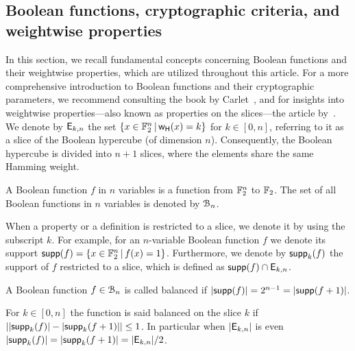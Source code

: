 \documentclass[11pt]{llncs}
\begin{document}
\subsection{Boolean functions, cryptographic criteria, and weightwise properties}

In this section, we recall fundamental concepts concerning Boolean functions and their weightwise properties, which are utilized throughout this article. For a more comprehensive introduction to Boolean functions and their cryptographic parameters, we recommend consulting the book by Carlet~\cite{Carlet20},
and for insights into weightwise properties—also known as properties on the slices—the article by~\cite{TOSC:CarMeaRot17}.
We denote by $\mathsf{E}_{k,n}$ the set $\{x\in \mathbb{F}_2^n \, | \, \mathsf{w_H}(x)=k \}$ for $k \in [0,n]$, referring to it as a slice of the Boolean hypercube (of dimension $n$). 
Consequently, the Boolean hypercube is divided into $n+1$ slices, where the elements share the same Hamming weight.


\begin{definition}\label{def:bool_f}
	A Boolean function $f$ in $n$ variables is a function from $\mathbb{F}_2^n$ to $\mathbb{F}_2$. 
	The set of all Boolean functions in $n$ variables is denoted by $\mathcal{B}_n$.%
\end{definition}


When a property or a definition is restricted to a slice, we denote it by using the subscript $k$. 
For example, for an $n$-variable Boolean function $f$ we denote its support $\mathsf{supp}(f)=\{x\in \mathbb{F}_2^n \, | \, f(x)=1  \}$. 
Furthermore, we denote by $\mathsf{supp}_{k}(f)$ the support of $f$ restricted to a slice, which is defined as $\mathsf{supp}(f)\cap \mathsf{E}_{k,n}$.


\begin{definition}[Balancedness]\label{def:balancedness}
	A Boolean function $f\in \mathcal{B}_n$ is called balanced if $|\mathsf{supp}(f)|=2^{n-1}=|\mathsf{supp}(f+1)|$. 
	
	For $k\in [0,n]$ the function is said balanced on the slice $k$ if $||\mathsf{supp}_{k}(f)|-|\mathsf{supp}_{k}(f+1)| |\le 1$. In particular when $|\mathsf{E}_{k,n}|$ is even $|\mathsf{supp}_{k}(f)|=|\mathsf{supp}_{k}(f+1)|=|\mathsf{E}_{k,n}|/2$.
\end{definition}
\end{document}
